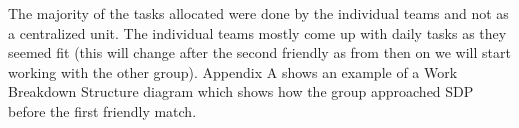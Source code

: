 The majority of the tasks allocated were done by the individual teams and not as a centralized unit. The individual teams mostly come up with daily tasks as they seemed fit (this will change after the second friendly as from then on we will start working with the other group). Appendix A shows an example of a Work Breakdown Structure diagram which shows how the group approached SDP before the first friendly match.
